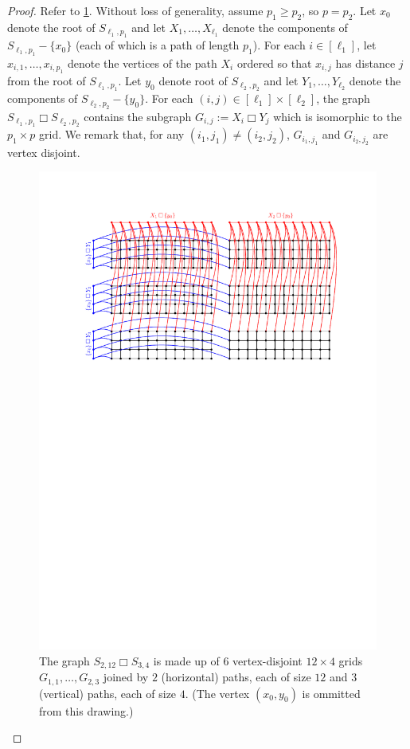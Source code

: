 \documentclass[12pt]{article}
\newcommand{\boxprod}{\mathbin{\Box}}
\renewcommand{\ge}{\geqslant}
\theoremstyle{plain}
\theoremstyle{definition}
\begin{document}
\begin{proof}
  Refer to \cref{t1xt2}.
  Without loss of generality, assume $p_1\ge p_2$, so $p=p_2$.    Let $x_0$ denote the root of $S_{\ell_1,p_1}$ and let $X_1,\ldots,X_{\ell_1}$ denote the components of $S_{\ell_1,p_1}-\{x_0\}$ (each of which is a path of length  $p_1$).  For each $i\in[\ell_1]$, let $x_{i,1},\ldots,x_{i,p_1}$ denote the vertices of the path $X_i$ ordered so that $x_{i,j}$ has distance $j$ from the root of $S_{\ell_1,p_1}$.   Let $y_0$ denote root of $S_{\ell_2,p_2}$ and let $Y_1,\ldots,Y_{\ell_2}$ denote the components of $S_{\ell_2,p_2}-\{y_0\}$.  For each $(i,j)\in [\ell_1]\times [\ell_2]$, the graph $S_{\ell_1,p_1}\boxprod S_{\ell_2,p_2}$ contains the subgraph $G_{i,j}:=X_i\boxprod Y_j$ which is isomorphic to the $p_1\times p$ grid. We remark that, for any $(i_1,j_1)\neq(i_2,j_2)$, $G_{i_1,j_1}$ and $G_{i_2,j_2}$ are vertex disjoint.

  \begin{figure}
    \begin{center}
      \includegraphics{t1xt2}
    \end{center}
    \caption{The graph $S_{2,12}\boxprod S_{3,4}$ is made up of $6$ vertex-disjoint $12\times 4$ grids $G_{1,1},\ldots,G_{2,3}$ joined by $2$ (horizontal) paths, each of size $12$ and $3$ (vertical) paths, each of size $4$.  (The vertex $(x_0,y_0)$ is ommitted from this drawing.)}
    \label{t1xt2}
  \end{figure}


\end{proof}
\end{document}
